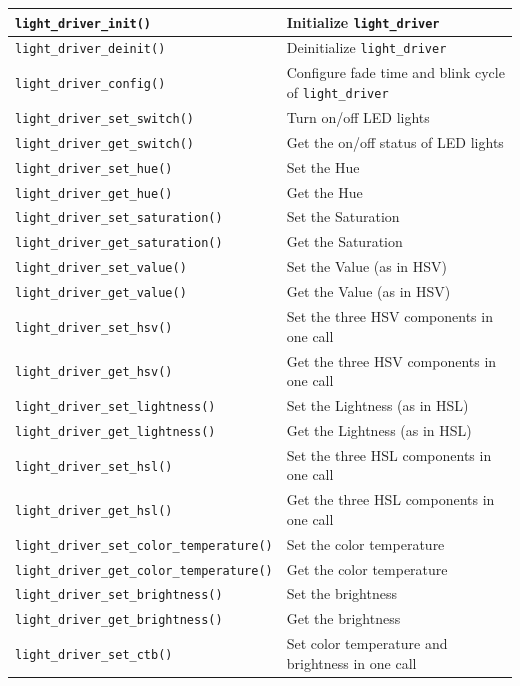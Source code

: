 \documentclass[a4paper,12pt,openany]{book}
\begin{document}
{\begin{longtable}{|>{\footnotesize}m{}|>{\footnotesize}m{}|}
    \verb|light_driver_init()|&Initialize \verb|light_driver|\\
    \hline
    \verb|light_driver_deinit()|&Deinitialize \verb|light_driver|\\
    \hline
    \verb|light_driver_config()|&Configure fade time and blink cycle of \verb|light_driver|\\
    \hline
    \verb|light_driver_set_switch()|&Turn on/off LED lights\\
    \hline
    \verb|light_driver_get_switch()|&Get the on/off status of LED lights\\
    \hline
    \verb|light_driver_set_hue()|&Set the Hue\\
    \hline
    \verb|light_driver_get_hue()|&Get the Hue\\
    \hline
    \verb|light_driver_set_saturation()|&Set the Saturation\\
    \hline
    \verb|light_driver_get_saturation()|&Get the Saturation\\
    \hline
    \verb|light_driver_set_value()|&Set the Value (as in HSV)\\
    \hline
    \verb|light_driver_get_value()|&Get the Value (as in HSV)\\
    \hline
    \verb|light_driver_set_hsv()|&Set the three HSV components in one call\\
    \hline
    \verb|light_driver_get_hsv()|&Get the three HSV components in one call\\
    \hline
    \verb|light_driver_set_lightness()|&Set the Lightness (as in HSL)\\
    \hline
    \verb|light_driver_get_lightness()|&Get the Lightness (as in HSL)\\
    \hline
    \verb|light_driver_set_hsl()|&Set the three HSL components in one call\\
    \hline
    \verb|light_driver_get_hsl()|&Get the three HSL components in one call\\
    \hline
    \verb|light_driver_set_color_temperature()|&Set the color temperature\\
    \hline
    \verb|light_driver_get_color_temperature()|&Get the color temperature\\
    \hline
    \verb|light_driver_set_brightness()|&Set the brightness\\
    \hline
    \verb|light_driver_get_brightness()|&Get the brightness\\
    \hline
    \verb|light_driver_set_ctb()|&Set color temperature and brightness in one call\\

\end{longtable}}
\end{document}
